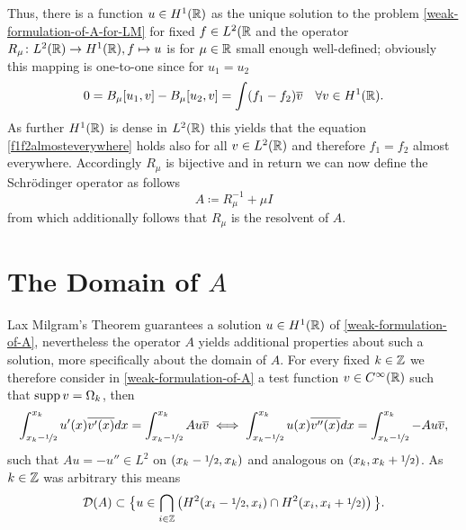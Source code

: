 Thus, there is a function $u \in H^{1}(\mathbb{R})$ as the unique solution to the problem \eqref{weak-formulation-of-A-for-LM} for fixed $f \in L^{2}(\mathbb{R}$ and the operator $R_{\mu} \colon L^{2}(\mathbb{R}) \rightarrow H^{1}(\mathbb{R}), f \mapsto u$ is for $\mu \in \mathbb{R}$ small enough well-defined; obviously this mapping is one-to-one since for $u_{1} = u_{2}$
	\begin{equation}
		0 = B_{\mu}[u_{1}, v] - B_{\mu}[u_{2}, v]= \int (f_{1} - f_{2}) \overline{v} \quad \forall v \in H^{1}(\mathbb{R}). \label{f1f2almosteverywhere}
	\end{equation} 
As further $H^{1}(\mathbb{R})$ is dense in $L^{2}(\mathbb{R})$ this yields that the equation \eqref{f1f2almosteverywhere} holds also for all $v \in L^{2}(\mathbb{R})$ and therefore $f_{1} = f_{2}$ almost everywhere. Accordingly $R_{\mu}$ is bijective and in return we can now define the Schrödinger operator as follows
		\[ A \coloneqq R_{\mu}^{-1} + \mu I \]
from which additionally follows that $R_{\mu}$ is the resolvent of $A$.

\section{\texorpdfstring{The Domain of $A$}{The Domain of A}}
Lax Milgram's Theorem guarantees a solution $u \in H^{1}(\mathbb{R})$ of \eqref{weak-formulation-of-A}, nevertheless the operator $A$ yields additional properties about such a solution, more specifically about the domain of $A$. For every fixed $k \in \mathbb{Z}$ we therefore consider in \eqref{weak-formulation-of-A} a test function $v \in C^{\infty}(\mathbb{R})$ such that $\operatorname{supp} v = \Omega_{k}$, then
	\[ \int_{x_{k}-\nicefrac{1}{2}}^{x_{k}} u'(x) \overline{v'(x)} dx = \int_{x_{k}-\nicefrac{1}{2}}^{x_{k}} A u \overline{v} \iff \int_{x_{k}-\nicefrac{1}{2}}^{x_{k}} u(x) \overline{v''(x)} dx = \int_{x_{k}-\nicefrac{1}{2}}^{x_{k}} - A u \overline{v}, \]
such that $A u = - u'' \in L^{2}$ on $(x_{k} -\nicefrac{1}{2}, x_{k})$ and analogous on $(x_{k}, x_{k} + \nicefrac{1}{2})$.
As $k \in \mathbb{Z}$ was arbitrary this means 
	$$ \mathcal{D}(A) \subset \big\{ u \in \bigcap_{i \in \mathbb{Z}} \left( H^{2}(x_{i}-\nicefrac{1}{2}, x_{i}) \cap H^{2}(x_{i}, x_{i} + \nicefrac{1}{2}) \right) \big\}. $$
	
